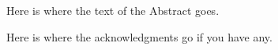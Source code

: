 \documentclass[11pt]{psuthesis}
\begin{document}
\begin{frontmatter}


\begin{doublespace}
\titlepage
\end{doublespace}

\committeepage

\abstract

Here is where the text of the Abstract goes.







\tables


\acknowledgments  %

Here is where the acknowledgments go if you have any.



\clearpage


\end{frontmatter}
\end{document}
